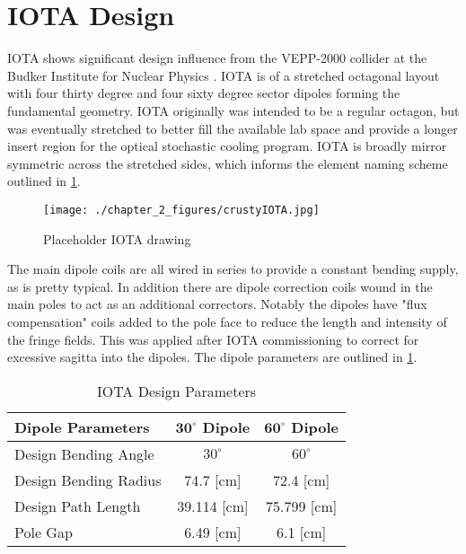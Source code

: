 \section{IOTA Design}
IOTA shows significant design influence from the VEPP-2000 collider at the Budker Institute for Nuclear Physics \cite{shatunovProjectNewElectronPositron}. IOTA is of a stretched octagonal layout with four thirty degree and four sixty degree sector dipoles forming the fundamental geometry. IOTA originally was intended to be a regular octagon, but was eventually stretched to better fill the available lab space and provide a longer insert region for the optical stochastic cooling program. IOTA is broadly mirror symmetric across the stretched sides, which informs the element naming scheme outlined in \ref{fig:iotaNames}.

\begin{figure}
	\centering
	\texttt{[image: ./chapter\_2\_figures/crustyIOTA.jpg]}
	\caption{Placeholder IOTA drawing}
	\label{fig:iotaNames}
\end{figure}

The main dipole coils are all wired in series to provide a constant bending supply, as is pretty typical. In addition there are dipole correction coils wound in the main poles to act as an additional correctors. Notably the dipoles have "flux compensation" coils added to the pole face to reduce the length and intensity of the fringe fields. This was applied after IOTA commissioning to correct for excessive sagitta into the dipoles. The dipole parameters are outlined in \ref{tab:dipole}. 

\begin{table}
    \centering
    \begin{tabular}{lcc}
    \toprule
    \textbf{Dipole Parameters} & \textbf{$\mathbf{30^{\circ}}$ Dipole} & \textbf{$\mathbf{60^{\circ}}$ Dipole}\\
    \midrule
    Design Bending Angle & $30^{\circ}$ & $60^{\circ}$\\
    Design Bending Radius & 74.7 [cm] & 72.4 [cm]\\
    Design Path Length & 39.114 [cm] & 75.799 [cm]\\
    Pole Gap & 6.49 [cm] & 6.1 [cm] \\
    \bottomrule
    \end{tabular}
    \caption{IOTA Design Parameters}
    \label{tab:dipole}
\end{table}

